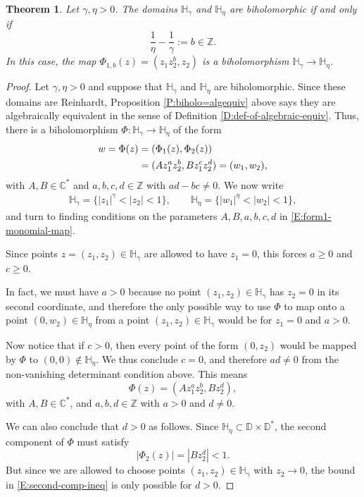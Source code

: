 \documentclass[letterpaper,11pt,reqno]{amsart}
\theoremstyle{plain}
\newtheorem{theorem}[equation]{Theorem}
\theoremstyle{definition}
\theoremstyle{remark}
\theoremstyle{remark}
\numberwithin{equation}{section}
\newcommand{\C}{{\mathbb C}}
\newcommand{\D}{{\mathbb D}}
\newcommand{\h}{{\mathbb H}}
\newcommand{\Z}{{\mathbb Z}}
\begin{document}
\begin{theorem}\label{T:gen-Hartogs-biholo}
Let $\gamma,\eta > 0$.
The domains $\h_\gamma$ and $\h_\eta$ are biholomorphic if and only if 
\begin{equation}\label{E:nec-and-suff-cond-biholo}
\frac{1}{\eta} - \frac{1}{\gamma} := b \in \Z.
\end{equation}
In this case, the map $\Phi_{1,b}(z) = (z_1 z_2^b, z_2)$ is a biholomorphism $\h_\gamma \to \h_\eta$.
\end{theorem}
\begin{proof}
Let $\gamma,\eta > 0$ and suppose that $\h_\gamma$ and $\h_\eta$ are biholomorphic.
Since these domains are Reinhardt, Proposition \ref{P:biholo=algequiv} above says they are algebraically equivalent in the sense of Definition \ref{D:def-of-algebraic-equiv}.
Thus, there is a biholomorphism $\Phi:\h_\gamma \to \h_\eta$ of the form
\begin{align}
w = \Phi(z) &= (\Phi_1(z),\Phi_2(z)) \notag \\
&= (Az_1^a z_2^b, B z_1^c z_2^d)
= (w_1,w_2), \label{E:form1-monomial-map}
\end{align}
with $A,B \in \C^*$ and $a,b,c,d \in \Z$ with $ad-bc \neq 0$.
We now write
\begin{align*}
\h_\gamma = \{|z_1|^\gamma < |z_2| < 1 \}, \qquad
\h_\eta = \{|w_1|^\eta < |w_2| < 1 \},
\end{align*}
and turn to finding conditions on the parameters $A,B,a,b,c,d$ in \eqref{E:form1-monomial-map}.

Since points $z = (z_1,z_2) \in \h_\gamma$ are allowed to have $z_1=0$, this forces $a \ge 0$ and $c \ge 0$.

In fact, we must have $a>0$ because no point $(z_1,z_2) \in \h_\gamma$ has $z_2 = 0$ in its second coordinate, and therefore the only possible way to use $\Phi$ to map onto a point $(0,w_2) \in \h_\eta$ from a point $(z_1,z_2) \in \h_\gamma$ would be for $z_1 = 0$ and $a>0$.

Now notice that if $c>0$, then every point of the form $(0,z_2)$ would be mapped by $\Phi$ to $(0,0) \notin \h_\eta$.
We thus conclude $c = 0$, and therefore $ad \neq 0$ from the non-vanishing determinant condition above. 
This means
\begin{equation}\label{E:form2-monomial-map}
\Phi(z) = (Az_1^a z_2^b, B z_2^d),
\end{equation}
with $A,B \in \C^*$, and $a,b,d \in \Z$ with $a>0$ and $d \neq 0$.

We can also conclude that $d>0$ as follows.
Since $\h_\eta \subset \D \times \D^*$, the second component of $\Phi$ must satisfy
\begin{equation}\label{E:second-comp-ineq}
|\Phi_2(z)| = |B z_2^d| < 1.
\end{equation}
But since we are allowed to choose points $(z_1,z_2) \in \h_\gamma$ with $z_2 \to 0$, the bound in \eqref{E:second-comp-ineq} is only possible for $d>0$.


\end{proof}
\end{document}
